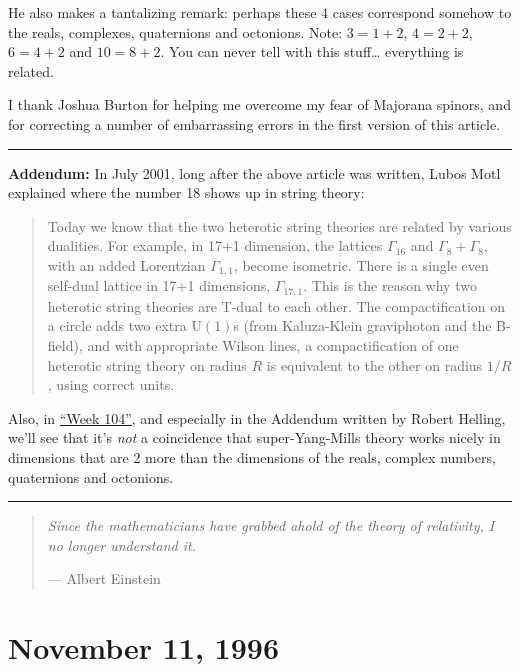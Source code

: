 \documentclass{article}
\begin{document}
He also makes a tantalizing remark: perhaps these 4 cases correspond
somehow to the reals, complexes, quaternions and octonions. Note:
\(3 = 1 + 2\), \(4 = 2 + 2\), \(6 = 4 + 2\) and \(10 = 8 + 2\). You can
never tell with this stuff\ldots{} everything is related.

I thank Joshua Burton for helping me overcome my fear of Majorana
spinors, and for correcting a number of embarrassing errors in the first
version of this article.

\begin{center}\rule{0.5\linewidth}{0.5pt}\end{center}

\textbf{Addendum:} In July 2001, long after the above article was
written, Lubos Motl explained where the number 18 shows up in string
theory:

\begin{quote}
Today we know that the two heterotic string theories are related by
various dualities. For example, in 17+1 dimension, the lattices
\(\Gamma_{16}\) and \(\Gamma_8+\Gamma_8\), with an added Lorentzian
\(\Gamma_{1,1}\), become isometric. There is a single even self-dual
lattice in 17+1 dimensions, \(\Gamma_{17,1}\). This is the reason why
two heterotic string theories are T-dual to each other. The
compactification on a circle adds two extra \(\mathrm{U}(1)\)s (from
Kaluza-Klein graviphoton and the B-field), and with appropriate Wilson
lines, a compactification of one heterotic string theory on radius \(R\)
is equivalent to the other on radius \(1/R\), using correct units.
\end{quote}

Also, in \protect\hyperlink{week104}{``Week 104''}, and especially in
the Addendum written by Robert Helling, we'll see that it's \emph{not} a
coincidence that super-Yang-Mills theory works nicely in dimensions that
are 2 more than the dimensions of the reals, complex numbers,
quaternions and octonions.

\begin{center}\rule{0.5\linewidth}{0.5pt}\end{center}

\begin{quote}
\emph{Since the mathematicians have grabbed ahold of the theory of
relativity, I no longer understand it.}

--- Albert Einstein
\end{quote}



\hypertarget{week94}{%
\section{November 11, 1996}\label{week94}}
\end{document}
